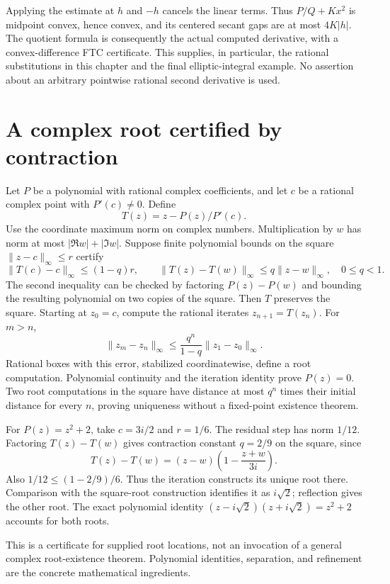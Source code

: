 Applying the estimate at $h$ and $-h$ cancels the linear terms.  Thus
$P/Q+Kx^2$ is midpoint convex, hence convex, and its centered secant gaps
are at most $4K|h|$.  The quotient formula is consequently the actual
computed derivative, with a convex-difference FTC certificate.  This
supplies, in particular, the rational substitutions in this chapter and
the final elliptic-integral example.  No assertion about an arbitrary
pointwise rational second derivative is used.

\section{A complex root certified by contraction}
Let $P$ be a polynomial with rational complex coefficients, and let $c$
be a rational complex point with $P'(c)\ne0$.  Define
\[
 T(z)=z-P(z)/P'(c).
\]
Use the coordinate maximum norm on complex numbers.  Multiplication by
$w$ has norm at most $|\Re w|+|\Im w|$.  Suppose finite polynomial
bounds on the square $\|z-c\|_\infty\le r$ certify
\[
 \|T(c)-c\|_\infty\le(1-q)r,\qquad
 \|T(z)-T(w)\|_\infty\le q\|z-w\|_\infty,
 \quad 0\le q<1.
\]
The second inequality can be checked by factoring $P(z)-P(w)$ and
bounding the resulting polynomial on two copies of the square.
Then $T$ preserves the square.  Starting at $z_0=c$, compute the rational
iterates $z_{n+1}=T(z_n)$.  For $m>n$,
\[
 \|z_m-z_n\|_\infty
       \le\frac{q^n}{1-q}\|z_1-z_0\|_\infty.
\]
Rational boxes with this error, stabilized coordinatewise, define a root
computation.  Polynomial continuity and the iteration identity prove
$P(z)=0$.  Two root computations in the square have distance at most
$q^n$ times their initial distance for every $n$, proving uniqueness
without a fixed-point existence theorem.

\begin{example}
For $P(z)=z^2+2$, take $c=3i/2$ and $r=1/6$.  The residual step has norm
$1/12$.  Factoring $T(z)-T(w)$ gives contraction constant $q=2/9$ on
the square, since
\[
 T(z)-T(w)=(z-w)\left(1-\frac{z+w}{3i}\right).
\]
Also $1/12\le(1-2/9)/6$.  Thus the iteration constructs its unique root
there.  Comparison with the square-root construction identifies it as
$i\sqrt2$; reflection gives the other root.  The exact polynomial identity
$(z-i\sqrt2)(z+i\sqrt2)=z^2+2$ accounts for both roots.
\end{example}

This is a certificate for supplied root locations, not an invocation of a
general complex root-existence theorem.  Polynomial identities, separation,
and refinement are the concrete mathematical ingredients.

